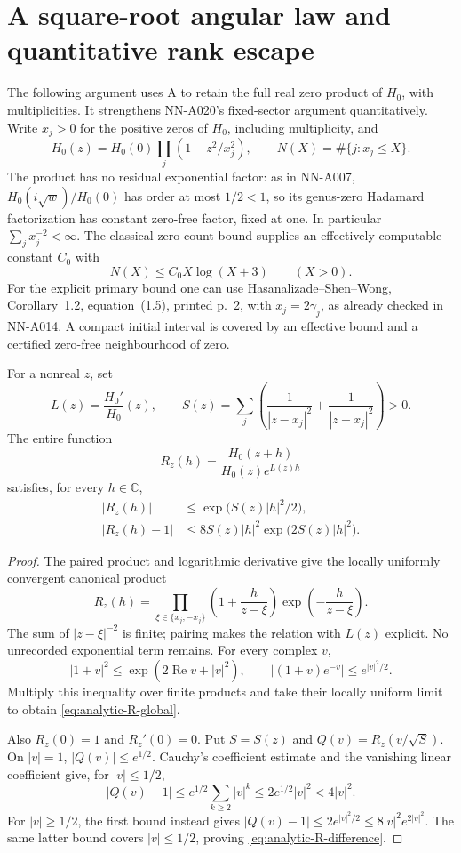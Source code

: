\section{A square-root angular law and quantitative rank escape}
\label{sec:analytic-angular-heat-rate}

The following argument uses A to retain the full real zero product
of $H_0$, with multiplicities. It strengthens NN-A020's fixed-sector
argument quantitatively. Write $x_j>0$ for the positive zeros of
$H_0$, including multiplicity, and
\[
 H_0(z)=H_0(0)\prod_j(1-z^2/x_j^2),\qquad
 N(X)=\#\{j:x_j\le X\}.
\]
The product has no residual exponential factor: as in NN-A007,
$H_0(i\sqrt w)/H_0(0)$ has order at most $1/2<1$, so its genus-zero
Hadamard factorization has constant zero-free factor, fixed at one.
In particular $\sum_jx_j^{-2}<\infty$. The classical zero-count
bound supplies an effectively computable constant $C_0$ with
\[
                       N(X)\le C_0 X\log(X+3)\qquad(X>0).
\]
For the explicit primary bound one can use
Hasanalizade--Shen--Wong, Corollary~1.2, equation~(1.5),
printed p.~2, with $x_j=2\gamma_j$, as already checked in
NN-A014. A compact initial interval is covered by an effective
bound and a certified zero-free neighbourhood of zero.

\begin{lemma}
\label{lem:analytic-product-remainder}
For a nonreal $z$, set
\[
 L(z)=\frac{H_0'}{H_0}(z),\qquad
 S(z)=\sum_j\left(\frac1{|z-x_j|^2}+\frac1{|z+x_j|^2}\right)>0.
\]
The entire function
\[
 R_z(h)=\frac{H_0(z+h)}{H_0(z)e^{L(z)h}}
\]
satisfies, for every $h\in\mathbb C$,
\begin{align}
 |R_z(h)|&\le \exp\bigl(S(z)|h|^2/2\bigr),
                  \label{eq:analytic-R-global}\\
 |R_z(h)-1|&\le
     8S(z)|h|^2\exp\bigl(2S(z)|h|^2\bigr).
                  \label{eq:analytic-R-difference}
\end{align}
\end{lemma}

\begin{proof}
The paired product and logarithmic derivative give the locally
uniformly convergent canonical product
\[
 R_z(h)=\prod_{\xi\in\{x_j,-x_j\}}
           \left(1+\frac h{z-\xi}\right)
                       \exp\left(-\frac h{z-\xi}\right).
\]
The sum of $|z-\xi|^{-2}$ is finite; pairing makes the relation
with $L(z)$ explicit. No unrecorded exponential term remains.
For every complex $v$,
\[
 |1+v|^2\le\exp(2\operatorname{Re}v+|v|^2),
 \qquad |(1+v)e^{-v}|\le e^{|v|^2/2}.
\]
Multiply this inequality over finite products and take their
locally uniform limit to obtain \eqref{eq:analytic-R-global}.

Also $R_z(0)=1$ and $R_z'(0)=0$. Put $S=S(z)$ and
$Q(v)=R_z(v/\sqrt S)$. On $|v|=1$, $|Q(v)|\le e^{1/2}$.
Cauchy's coefficient estimate and the vanishing linear
coefficient give, for $|v|\le1/2$,
\[
 |Q(v)-1|
       \le e^{1/2}\sum_{k\ge2}|v|^k
       \le2e^{1/2}|v|^2<4|v|^2.
\]
For $|v|\ge1/2$, the first bound instead gives
$|Q(v)-1|\le2e^{|v|^2/2}\le8|v|^2e^{2|v|^2}$.
The same latter bound covers $|v|\le1/2$, proving
\eqref{eq:analytic-R-difference}.
\end{proof}

